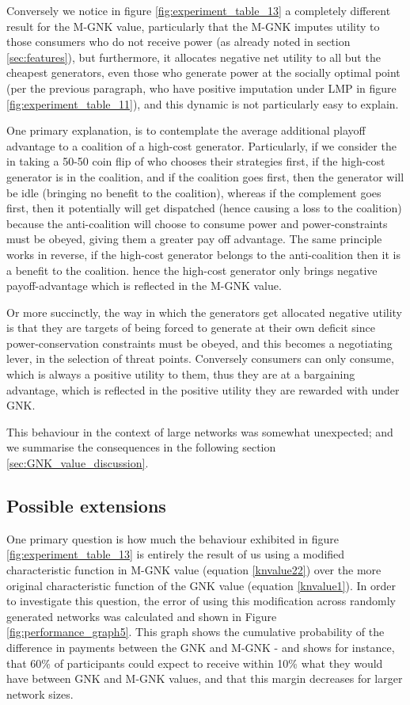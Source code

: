 Conversely we notice in figure \ref{fig:experiment_table_13} a completely different result for the M-GNK value, particularly that the M-GNK imputes utility to those consumers who do not receive power (as already noted in section \ref{sec:features}), but furthermore, it allocates negative net utility to all but the cheapest generators, even those who generate power at the socially optimal point (per the previous paragraph, who have positive imputation under LMP in figure \ref{fig:experiment_table_11}), and this dynamic is not particularly easy to explain.

One primary explanation, is to contemplate the average additional playoff advantage to a coalition of a high-cost generator.
Particularly, if we consider the in taking a 50-50 coin flip of who chooses their strategies first, if the high-cost generator is in the coalition, and if the coalition goes first, then the generator will be idle (bringing no benefit to the coalition), whereas if the complement goes first, then it potentially will get dispatched (hence causing a loss to the coalition) because the anti-coalition will choose to consume power and power-constraints must be obeyed, giving them a greater pay off advantage.
The same principle works in reverse, if the high-cost generator belongs to the anti-coalition then it is a benefit to the coalition.
hence the high-cost generator only brings negative payoff-advantage which is reflected in the M-GNK value.

Or more succinctly, the way in which the generators get allocated negative utility is that they are targets of being forced to generate at their own deficit since power-conservation constraints must be obeyed, and this becomes a negotiating lever, in the selection of threat points.
Conversely consumers can only consume, which is always a positive utility to them, thus they are at a bargaining advantage, which is reflected in the positive utility they are rewarded with under GNK.

This behaviour in the context of large networks was somewhat unexpected; and we summarise the consequences in the following section \ref{sec:GNK_value_discussion}.

\subsection{Possible extensions}\label{sec:GNK_extensions_discussion}

One primary question is how much the behaviour exhibited in figure \ref{fig:experiment_table_13} is entirely the result of us using a modified characteristic function in M-GNK value (equation \ref{knvalue22}) over the more original characteristic function of the GNK value (equation \ref{knvalue1}).
In order to investigate this question, the error of using this modification across randomly generated networks was calculated and shown in Figure \ref{fig:performance_graph5}.
This graph shows the cumulative probability of the difference in payments between the GNK and M-GNK - and shows for instance, that 60\% of participants could expect to receive within 10\% what they would have between GNK and M-GNK values, and that this margin decreases for larger network sizes.

